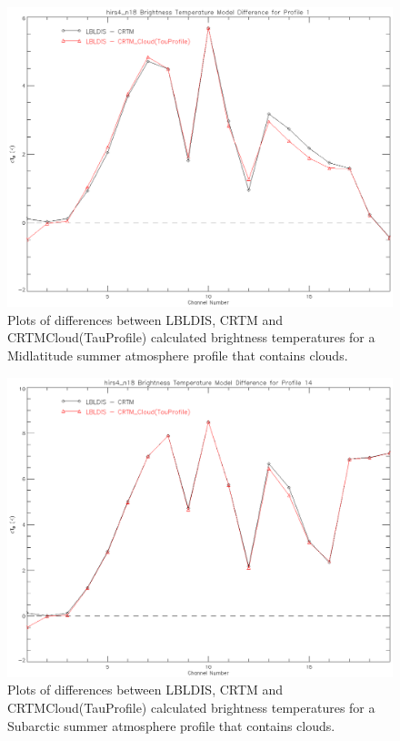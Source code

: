 \begin{figure}[htp]
  \centering{}
  \includegraphics[scale=0.8]{./graphics/Midlatitude_Clouds_01.eps}
  \caption{Plots of differences between LBLDIS, CRTM and CRTM\textunderscore{}Cloud(TauProfile) calculated brightness temperatures for 
   a Midlatitude summer atmosphere profile that contains clouds.}
  \label{fig:MidLat_Cloud}
\end{figure}

\begin{figure}[htp]
  \centering{}
  \includegraphics[scale=0.8]{./graphics/SubArctic_Clouds_14.eps}
  \caption{Plots of differences between LBLDIS, CRTM and CRTM\textunderscore{}Cloud(TauProfile) calculated brightness temperatures for 
   a Subarctic summer atmosphere profile that contains clouds.}
  \label{fig:SubArctic_Cloud}
\end{figure}  





\begin{appendix}
\end{appendix}




